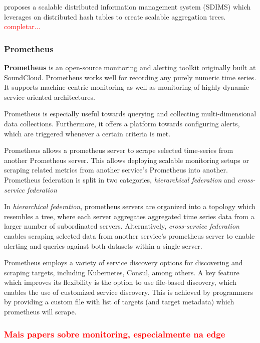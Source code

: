 \cite{10.1145/1030194.1015509} proposes a scalable distributed information management system (SDIMS) which leverages on distributed hash tables to create scalable aggregation trees. \textcolor{red}{completar...}

\subsubsection{Prometheus}

\textbf{Prometheus} \cite{prometheus} is an open-source monitoring and alerting toolkit originally built at SoundCloud. Prometheus works well for recording any purely numeric time series. It supports machine-centric monitoring as well as monitoring of highly dynamic service-oriented architectures. 

Prometheus is especially useful towards querying and collecting multi-dimensional data collections. Furthermore, it offers a platform towards configuring alerts, which are triggered whenever a certain criteria is met.

Prometheus allows a prometheus server to scrape selected time-series from another Prometheus server. This allows deploying scalable monitoring setups or scraping related metrics from another service's Prometheus into another. Prometheus federation is split in two categories, \textit{hierarchical federation} and \textit{cross-service federation} 

In \textit{hierarchical federation}, prometheus servers are organized into a topology which resembles a tree, where each server aggregates aggregated time series data from a larger number of subordinated servers. Alternatively,  \textit{cross-service federation} enables scraping selected data from another service's prometheus server to enable alerting and queries against both datasets within a single server. 

Prometheus employs a variety of service discovery options for discovering and scraping targets, including Kubernetes, Consul, among others. A key feature which improves its flexibility is the option to use file-based discovery,  which enables the use of customized service discovery. This is achieved by programmers by providing a custom file with list of targets (and target metadata) which prometheus will scrape.

\subsubsection{\textcolor{red}{Mais papers sobre monitoring, especialmente na edge}}

